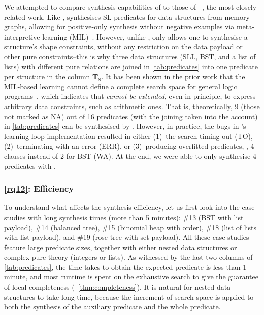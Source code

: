 We attempted to compare synthesis capabilities of \tool to those
of \shape~\cite{LPAR23:Learning_Data_Structure_Shapes}, the most closely
related work.
%
Like \tool, \shape synthesises SL predicates for data structures from
memory graphs, allowing for positive-only synthesis without negative
examples via meta-interpretive learning
(MIL)~\cite{muggleton2014meta}.
%
However, unlike \tool, \shape only allows one to synthesise a structure's shape
constraints, without any restriction on the data payload or other pure constraints--this is why three data structures (SLL, BST, and a list of lists) with different pure relations are joined in \autoref{tab:predicates} into one predicate per structure in the \shape column \textbf{T$_\text{S}$}.
%
It has been shown in the prior work that the MIL-based learning cannot
define a complete search space for general logic
programs~\cite{cropper2015logical}, which indicates that \shape
\emph{cannot be extended}, even in principle, to express arbitrary
data constraints, such as arithmetic ones.
%
That is, theoretically, 9 (those not marked as NA) out of 16 predicates (with the joining taken into the account) in \autoref{tab:predicates} can be synthesised by \shape. However, in
practice, the bugs in \shape's learning loop implementation resulted in either (1)~the search timing out (TO), (2)~\shape terminating with an error (ERR), or (3)~producing overfitted predicates, \eg, 4 clauses instead of 2 for BST (WA).
%
At the end, we were able to only synthesise 4 predicates with \shape.

%




\subsubsection*{\ref{rq12}: Efficiency}
To understand what affects the synthesis efficiency, let us first look
into the case studies with long synthesis times (more than 5 minutes):
\#13 (BST with list payload), \#14 (balanced tree), \#15 (binomial
heap with order), \#18 (list of lists with list payload), and \#19
(rose tree with set payload).
%
All these case studies feature large predicate sizes, together with
either nested data structures or complex pure theory (integers or
lists). As witnessed by the last two columns of
\autoref{tab:predicates}, the time \tool takes to obtain the expected
predicate is less than 1 minute, and most runtime is spent on the
exhaustive search to give the guarantee of local completeness
(\cf~\autoref{thm:completeness}).
%
It is natural for nested data structures to take long time, because
the increment of search space is applied to both the
synthesis of the auxiliary predicate and the whole predicate.

